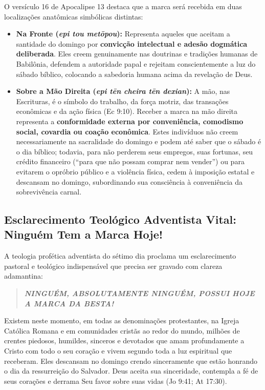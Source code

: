 O versículo 16 de Apocalipse 13 destaca que a marca será recebida em duas localizações anatômicas simbólicas distintas:
\begin{itemize}
  \item \textbf{Na Fronte (\textit{epi tou metōpou}):} Representa aqueles que aceitam a santidade do domingo por \textbf{convicção intelectual e adesão dogmática deliberada}. Eles creem genuinamente nas doutrinas e tradições humanas de Babilônia, defendem a autoridade papal e rejeitam conscientemente a luz do sábado bíblico, colocando a sabedoria humana acima da revelação de Deus.
  \item \textbf{Sobre a Mão Direita (\textit{epi tēn cheira tēn dexian}):} A mão, nas Escrituras, é o símbolo do trabalho, da força motriz, das transações econômicas e da ação física (Ec 9:10). Receber a marca na mão direita representa a \textbf{conformidade externa por conveniência, comodismo social, covardia ou coação econômica}. Estes indivíduos não creem necessariamente na sacralidade do domingo e podem até saber que o sábado é o dia bíblico; todavia, para não perderem seus empregos, suas fortunas, seu crédito financeiro (``para que não possam comprar nem vender'') ou para evitarem o opróbrio público e a violência física, cedem à imposição estatal e descansam no domingo, subordinando sua consciência à conveniência da sobrevivência carnal.
\end{itemize}




\subsection{Esclarecimento Teológico Adventista Vital: Ninguém Tem a Marca Hoje!}


A teologia profética adventista do sétimo dia proclama um esclarecimento pastoral e teológico indispensável que precisa ser gravado com clareza adamantina:


\begin{quote}
\itshape \textbf{NINGUÉM, ABSOLUTAMENTE NINGUÉM, POSSUI HOJE A MARCA DA BESTA!}
\end{quote}


Existem neste momento, em todas as denominações protestantes, na Igreja Católica Romana e em comunidades cristãs ao redor do mundo, milhões de crentes piedosos, humildes, sinceros e devotados que amam profundamente a Cristo com todo o seu coração e vivem segundo toda a luz espiritual que receberam. Eles descansam no domingo crendo sinceramente que estão honrando o dia da ressurreição do Salvador. Deus aceita sua sinceridade, contempla a fé de seus corações e derrama Seu favor sobre suas vidas (Jo 9:41; At 17:30).

